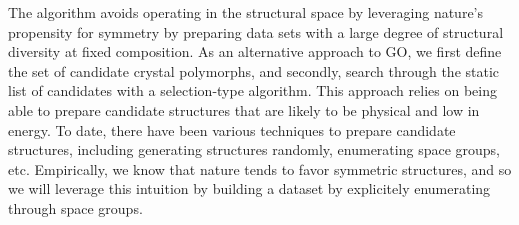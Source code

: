 %
The algorithm avoids operating in the structural space by leveraging nature's propensity for symmetry by preparing data sets with a large degree of structural diversity at fixed composition.  %
%
As an alternative approach to GO, we first define the set of candidate crystal polymorphs, and secondly, search through the static list of candidates with a selection-type algorithm.
%
This approach relies on being able to prepare candidate structures that are likely to be physical and low in energy.
%
To date, there have been various techniques to prepare candidate structures, including generating structures randomly, enumerating space groups, etc.
%
Empirically, we know that nature tends to favor symmetric structures, and so we will leverage this intuition by building a dataset by explicitely enumerating through space groups.

